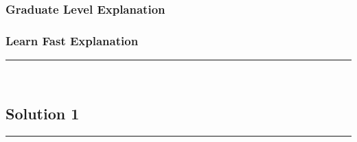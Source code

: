 \documentclass{article}
\begin{document}
\subsubsection*{Graduate Level Explanation}

\subsubsection*{Learn Fast Explanation}

\noindent\rule{\textwidth}{0.4pt}\\

\newpage

\subsection*{Solution 1}
\noindent\rule{\textwidth}{0.4pt}\\
\end{document}
